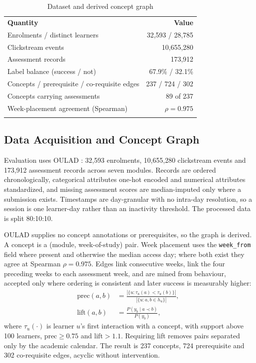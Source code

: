 \documentclass[graybox]{SNmult}
\begin{document}
\begin{table}[t]
\caption{Dataset and derived concept graph}
\label{tab:dataset}
\begin{tabular}{p{7.2cm}r}
\hline\noalign{\smallskip}
\textbf{Quantity} & \textbf{Value} \\
\noalign{\smallskip}\svhline\noalign{\smallskip}
Enrolments / distinct learners        & 32{,}593 / 28{,}785 \\
Clickstream events                    & 10{,}655{,}280 \\
Assessment records                    & 173{,}912 \\
Label balance (success / not)         & 67.9\% / 32.1\% \\
Concepts / prerequisite / co-requisite edges & 237 / 724 / 302 \\
Concepts carrying assessments         & 89 of 237 \\
Week-placement agreement (Spearman)   & $\rho = 0.975$ \\
\noalign{\smallskip}\hline\noalign{\smallskip}
\end{tabular}
\end{table}

\subsection{Data Acquisition and Concept Graph}
\label{subsec:data}

Evaluation uses OULAD \cite{kuzilek2017oulad}: 32{,}593 enrolments, 10{,}655{,}280
clickstream events and 173{,}912 assessment records across seven modules. Records are
ordered chronologically, categorical attributes one-hot encoded and numerical attributes
standardized, and missing assessment scores are median-imputed only where a submission
exists. Timestamps are day-granular with no intra-day resolution, so a session is one
learner-day rather than an inactivity threshold. The processed data is split 80:10:10.

OULAD supplies no concept annotations or prerequisites, so the graph is derived. A concept
is a (module, week-of-study) pair. Week placement uses the \texttt{week\_from} field where
present and otherwise the median access day; where both exist they agree at Spearman
$\rho = 0.975$. Edges link consecutive weeks, link the four preceding weeks to each
assessment week, and are mined from behaviour, accepted only where ordering is consistent
and later success is measurably higher:
\begin{equation}
\begin{split}
\mathrm{prec}(a,b) &= \frac{\left|\{u : \tau_u(a) < \tau_u(b)\}\right|}{\left|\{u : a, b \in h_u\}\right|},\\[2pt]
\mathrm{lift}(a,b) &= \frac{P(y_b \mid a \prec b)}{P(y_b)},
\end{split}
\label{eq:mining}
\end{equation}
where $\tau_u(\cdot)$ is learner $u$'s first interaction with a concept, with support above
100 learners, $\mathrm{prec} \geq 0.75$ and $\mathrm{lift} > 1.1$. Requiring lift removes
pairs separated only by the academic calendar. The result is 237 concepts, 724 prerequisite
and 302 co-requisite edges, acyclic without intervention.
\end{document}
